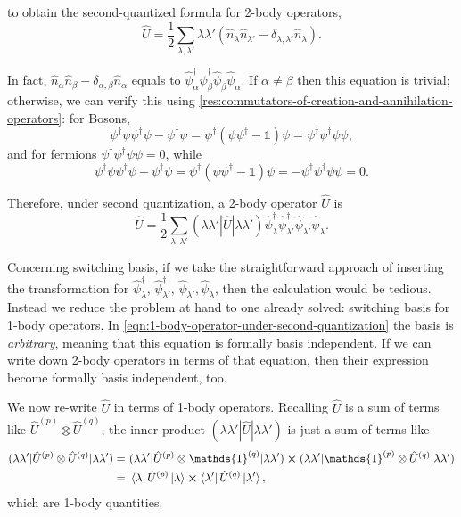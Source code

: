 \documentclass{article}
\theoremstyle{definition}
\theoremstyle{plain}
\numberwithin{equation}{section}
\begin{document}
to obtain the 
second-quantized formula for 2-body operators, 
\[
    \hat{U}
    =
    \frac{1}{2}
    \sum_{\lambda,\lambda'}
    \lambda \lambda'
    \left( \hat{n}_{\lambda}\hat{n}_{\lambda'}
    -
    \delta_{\lambda,\lambda'}
    \hat{n}_{\lambda} \right) .
\]

In fact, $\hat{n}_{\alpha}\hat{n}_{\beta}
    -
    \delta_{\alpha,\beta}
    \hat{n}_{\alpha}$ 
    equals to $\hat{\psi}^{\dagger}_{\alpha}\hat{\psi}^{\dagger}_{\beta}
    \hat{\psi}_{\beta}\hat{\psi}_{\alpha}$. 
If $\alpha \neq \beta$ then this equation is trivial; 
otherwise, we can verify this using 
\cref{res:commutators-of-creation-and-annihilation-operators}: 
for Bosons, 
\[
    \psi ^{\dagger} \psi \psi ^{\dagger} \psi
    -
    \psi ^{\dagger} \psi
    =
    \psi ^{\dagger} (\psi \psi ^{\dagger} -\mathds{1}) \psi
    = \psi ^{\dagger} \psi ^{\dagger} 
    \psi \psi,
\]
and for fermions $\psi ^{\dagger} \psi ^{\dagger} \psi \psi=0$, while
\[
    \psi ^{\dagger} \psi \psi ^{\dagger} \psi 
    -
    \psi ^{\dagger} \psi
    =
    \psi ^{\dagger} (\psi \psi ^{\dagger} -\mathds{1}) \psi
    =
    - \psi ^{\dagger} \psi ^{\dagger} \psi \psi =0.
\]

Therefore, under second quantization, 
a 2-body operator $\hat{U}$ is 
\begin{equation*}
    \hat{U}
    =
    \frac{1}{2}
    \sum_{\lambda,\lambda'}
    (\lambda \lambda'
    |\hat{U}|
    \lambda \lambda')
    \hat{\psi}^{\dagger}_{\lambda}
    \hat{\psi}^{\dagger}_{\lambda'}
    \hat{\psi}_{\lambda'}
    \hat{\psi}_{\lambda}.
\end{equation*}

Concerning switching basis, 
if we take the straightforward approach 
of inserting the 
transformation for $\hat{\psi}^{\dagger}_{\lambda}$, 
$\hat{\psi}^{\dagger}_{\lambda'}$, 
$\hat{\psi}_{\lambda'}, \hat{\psi}_{\lambda}$, then 
the calculation would be tedious. 
Instead we reduce the problem at hand 
to one already solved: switching basis 
for 1-body operators. 
In \cref{eqn:1-body-operator-under-second-quantization} 
the basis is \textit{arbitrary}, meaning that 
this equation is formally basis independent. 
If we can write down 2-body operators 
in terms of that equation, then 
their expression become formally basis independent, too.

We now 
re-write $\hat{U}$ 
in terms of 1-body operators. 
Recalling $\hat{U}$ is a sum of 
terms like $\hat{U}^{(p)}\otimes \hat{U}^{(q)}$, 
the inner product 
$
    (\lambda \lambda'
    |\hat{U}|
    \lambda \lambda')
$
is just a sum of terms like
\begin{align*}
    (\lambda \lambda' | \hat{U}^{(p)}\otimes \hat{U}^{(q)}
    |\lambda \lambda')
    =&\ 
    (\lambda \lambda' | \hat{U}^{(p)}\otimes \mathds{1}^{(q)}
    |\lambda \lambda')
    \cross 
    (\lambda \lambda' | \mathds{1}^{(p)}\otimes \hat{U}^{(q)}
    |\lambda \lambda')
    \\
    =&\ 
    \bra{\lambda} \hat{U}^{(p)} \ket{\lambda}
    \cross 
    \bra{\lambda'} \hat{U}^{(q)} \ket{\lambda'},
\end{align*}
which are 1-body quantities. 
\end{document}
